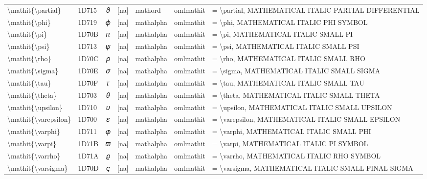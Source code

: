 \documentclass[a4paper,landscape]{article}
\begin{document}
\begin{longtable}{llcclll}
\textbackslash{}mathit\{\textbackslash{}partial\} & 1D715 & 𝜕 & [na] & mathord & omlmathit & = \textbackslash{}partial,  MATHEMATICAL ITALIC PARTIAL DIFFERENTIAL \\
\textbackslash{}mathit\{\textbackslash{}phi\} & 1D719 & 𝜙 & [na] & mathalpha & omlmathit & = \textbackslash{}phi,  MATHEMATICAL ITALIC PHI SYMBOL \\
\textbackslash{}mathit\{\textbackslash{}pi\} & 1D70B & 𝜋 & [na] & mathalpha & omlmathit & = \textbackslash{}pi,  MATHEMATICAL ITALIC SMALL PI \\
\textbackslash{}mathit\{\textbackslash{}psi\} & 1D713 & 𝜓 & [na] & mathalpha & omlmathit & = \textbackslash{}psi,  MATHEMATICAL ITALIC SMALL PSI \\
\textbackslash{}mathit\{\textbackslash{}rho\} & 1D70C & 𝜌 & [na] & mathalpha & omlmathit & = \textbackslash{}rho,  MATHEMATICAL ITALIC SMALL RHO \\
\textbackslash{}mathit\{\textbackslash{}sigma\} & 1D70E & 𝜎 & [na] & mathalpha & omlmathit & = \textbackslash{}sigma,  MATHEMATICAL ITALIC SMALL SIGMA \\
\textbackslash{}mathit\{\textbackslash{}tau\} & 1D70F & 𝜏 & [na] & mathalpha & omlmathit & = \textbackslash{}tau,  MATHEMATICAL ITALIC SMALL TAU \\
\textbackslash{}mathit\{\textbackslash{}theta\} & 1D703 & 𝜃 & [na] & mathalpha & omlmathit & = \textbackslash{}theta,  MATHEMATICAL ITALIC SMALL THETA \\
\textbackslash{}mathit\{\textbackslash{}upsilon\} & 1D710 & 𝜐 & [na] & mathalpha & omlmathit & = \textbackslash{}upsilon,  MATHEMATICAL ITALIC SMALL UPSILON \\
\textbackslash{}mathit\{\textbackslash{}varepsilon\} & 1D700 & 𝜀 & [na] & mathalpha & omlmathit & = \textbackslash{}varepsilon,  MATHEMATICAL ITALIC SMALL EPSILON \\
\textbackslash{}mathit\{\textbackslash{}varphi\} & 1D711 & 𝜑 & [na] & mathalpha & omlmathit & = \textbackslash{}varphi,  MATHEMATICAL ITALIC SMALL PHI \\
\textbackslash{}mathit\{\textbackslash{}varpi\} & 1D71B & 𝜛 & [na] & mathalpha & omlmathit & = \textbackslash{}varpi,  MATHEMATICAL ITALIC PI SYMBOL \\
\textbackslash{}mathit\{\textbackslash{}varrho\} & 1D71A & 𝜚 & [na] & mathalpha & omlmathit & = \textbackslash{}varrho,  MATHEMATICAL ITALIC RHO SYMBOL \\
\textbackslash{}mathit\{\textbackslash{}varsigma\} & 1D70D & 𝜍 & [na] & mathalpha & omlmathit & = \textbackslash{}varsigma,  MATHEMATICAL ITALIC SMALL FINAL SIGMA \\

\end{longtable}
\end{document}
